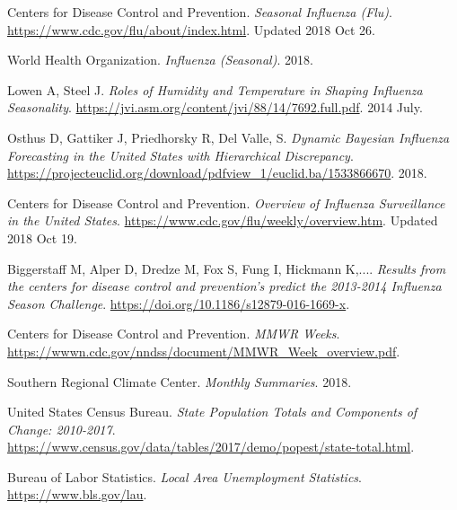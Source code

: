 \documentclass[12pt, onesided]{article}
\begin{document}
\begin{thebibliography}{9}

  Centers for Disease Control and Prevention.
  \emph{Seasonal Influenza (Flu)}.
  \url{https://www.cdc.gov/flu/about/index.html}.
  Updated 2018 Oct 26.

  World Health Organization.
  \emph{Influenza (Seasonal)}.
  2018.
  
Lowen A, Steel J.
\emph{Roles of Humidity and Temperature in Shaping Influenza Seasonality}.
\url{https://jvi.asm.org/content/jvi/88/14/7692.full.pdf}.
	2014 July.
	
Osthus D, Gattiker J, Priedhorsky R, Del Valle, S.
\emph{Dynamic Bayesian Influenza Forecasting in the United States with Hierarchical Discrepancy}. 
\url{https://projecteuclid.org/download/pdfview_1/euclid.ba/1533866670}.
2018.

Centers for Disease Control and Prevention.
\emph{Overview of Influenza Surveillance in the United States}.
\url{https://www.cdc.gov/flu/weekly/overview.htm}.
Updated 2018 Oct 19.

Biggerstaff M, Alper D, Dredze M, Fox S, Fung I, Hickmann K,....
\emph{Results from the centers for disease control and prevention's predict the 2013-2014 Influenza Season Challenge}.
\url{https://doi.org/10.1186/s12879-016-1669-x}.

Centers for Disease Control and Prevention.
\emph{MMWR Weeks}.
\url{https://wwwn.cdc.gov/nndss/document/MMWR_Week_overview.pdf}.

Southern Regional Climate Center.
\emph{Monthly Summaries}.
2018.

United States Census Bureau.
\emph{State Population Totals and Components of Change: 2010-2017}.
\url{https://www.census.gov/data/tables/2017/demo/popest/state-total.html}.

Bureau of Labor Statistics.
\emph{Local Area Unemployment Statistics}.
\url{https://www.bls.gov/lau}.

\end{thebibliography}
\end{document}

